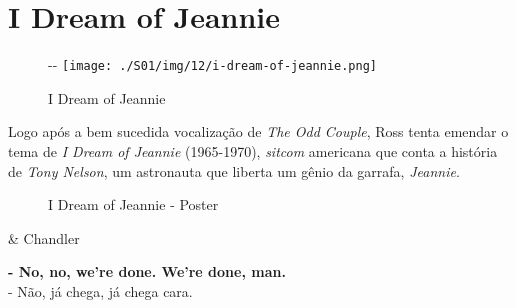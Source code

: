 \hypertarget{i-dream-of-jeannie}{%
\section{I Dream of Jeannie}\label{i-dream-of-jeannie}}

\begin{figure}[!ht]
  \begin{adjustwidth}{-\oddsidemargin-1in}{-\rightmargin}
    \centering
    \texttt{[image: ./S01/img/12/i-dream-of-jeannie.png]}
    \caption{I Dream of Jeannie\label{fig:i-dream-of-jeannie}}
  \end{adjustwidth}
\end{figure}

Logo após a bem sucedida vocalização de \emph{The Odd Couple}, Ross
tenta emendar o tema de \emph{I Dream of Jeannie} (1965-1970),
\emph{sitcom} americana que conta a história de \emph{Tony Nelson}, um
astronauta que liberta um gênio da garrafa, \emph{Jeannie}.

\begin{figure}
  \centering
    \caption{I Dream of Jeannie - Poster\label{fig:i-dream-of-jeannie-poster}}
\end{figure}

\begin{tcolorbox}[enhanced,center upper,
    drop fuzzy shadow southeast, boxrule=0.3pt,
    lower separated=false,
    colframe=black!30!dialogoBorder,colback=white]
\begin{minipage}[c]{0.16\linewidth}
   & \centering \scriptsize{Chandler}
\end{minipage}
\hfill
\begin{minipage}[c]{0.8\linewidth}
  \textbf{- No, no, we're done. We're done, man.}\\
  - Não, já chega, já chega cara.
\end{minipage}
\end{tcolorbox}

